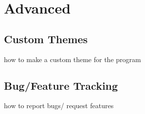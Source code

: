 \section{Advanced}
\subsection{Custom Themes}
how to make a custom theme for the program
\subsection{Bug/Feature Tracking}
how to report bugs/ request features
